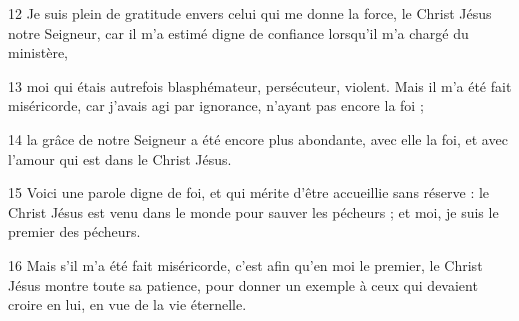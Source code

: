 
12 Je suis plein de gratitude envers celui qui me donne la force, le Christ Jésus notre Seigneur, car il m’a estimé digne de confiance lorsqu’il m’a chargé du ministère,

13 moi qui étais autrefois blasphémateur, persécuteur, violent. Mais il m’a été fait miséricorde, car j’avais agi par ignorance, n’ayant pas encore la foi ;

14 la grâce de notre Seigneur a été encore plus abondante, avec elle la foi, et avec l’amour qui est dans le Christ Jésus.

15 Voici une parole digne de foi, et qui mérite d’être accueillie sans réserve : le Christ Jésus est venu dans le monde pour sauver les pécheurs ; et moi, je suis le premier des pécheurs.

16 Mais s’il m’a été fait miséricorde, c’est afin qu’en moi le premier, le Christ Jésus montre toute sa patience, pour donner un exemple à ceux qui devaient croire en lui, en vue de la vie éternelle.